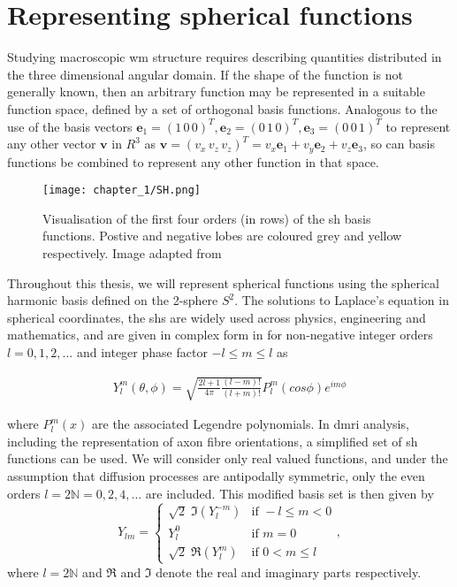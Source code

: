 \section{Representing spherical functions}
\label{sec:sh}


Studying macroscopic \gls{wm} structure requires describing quantities distributed in the three dimensional angular domain.
If the shape of the function is not generally known, then an arbitrary function may be represented in a suitable function space, defined by a set of orthogonal basis functions.
Analogous to the use of the basis vectors $\mathbf{e}_1=(1\,0\,0)^T, \mathbf{e}_2=(0\,1\,0)^T, \mathbf{e}_3=(0\,0\,1)^T$ to represent any other vector
$\mathbf{v}$ in $R^3$ as $\mathbf{v} =  (v_x\,v_z\,v_z)^T = v_x\mathbf{e}_1 + v_y\mathbf{e}_2 + v_z\mathbf{e}_3$,
so can basis functions be combined to represent any other function in that space.

\begin{SCfigure}
  \texttt{[image: chapter\_1/SH.png]}
  \caption{Visualisation of the first four orders (in rows) of the \gls{sh} basis functions. Postive and negative lobes are coloured grey and yellow respectively. Image adapted from \textcite{Inigo.quilez2014} }
  \label{fig:sh}
\end{SCfigure}

Throughout this thesis, we will represent spherical functions using the spherical harmonic basis defined on the 2-sphere $S^2$.
The solutions to Laplace's equation in spherical coordinates, the \glspl{sh} are widely used across physics, engineering and mathematics, and are given in complex form in for non-negative integer orders $l = 0, 1, 2,...$ and integer phase factor $-l \leqslant m \leqslant l$ as

\begin{align}
  Y_l^m(\theta,\phi) = \sqrt{ \frac{2l+1}{4\pi} \frac{(l-m)!}{(l+m)!} } P_l^m(cos\phi)e^{im\phi}
\end{align}

where $P_l^m(x)$ are the associated Legendre polynomials.
In \gls{dmri} analysis, including the representation of axon fibre orientations, a simplified set of \gls{sh} functions can be used.
We will consider only real valued functions, and under the assumption that diffusion processes are antipodally symmetric, only the even orders $l = 2 \mathbb{N} = 0,2,4,...$ are included.\autocite{Descoteaux2006}
This modified basis set is then given by
\begin{equation}
  Y_{lm} = \begin{cases}
              \sqrt{2} \; \Im (Y_l^{-m}) & \text{if } -l \leq m < 0 \\
              Y_l^0                      & \text{if } m=0 \\
              \sqrt{2} \; \Re (Y_l^m)    & \text{if } 0 < m \leq l
           \end{cases}, \label{eq:sh}
\end{equation}
where $l = 2\mathbb{N}$ and $\Re$ and $\Im$ denote the real and imaginary parts respectively.

